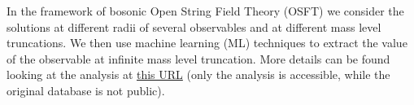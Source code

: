 In the framework of bosonic Open String Field Theory (OSFT) we consider the
solutions at different radii of several observables and at different mass level
truncations.
We then use machine learning (ML) techniques to extract the value of the
observable at infinite mass level truncation.
More details can be found looking at the analysis at
\href{https://thesfinox.github.io/ml-sft-trunc/}{this URL} (only the analysis
is accessible, while the original database is not public).
